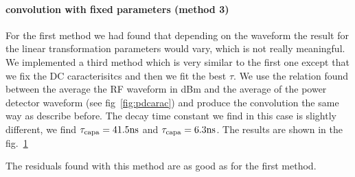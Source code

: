 \newpage
\paragraph{convolution with fixed parameters (method 3)}
For the first  method we had found that depending  on the waveform the
result for  the linear transformation parameters would  vary, which is
not really  meaningful.  We implemented  a third method which  is very
similar to the first one except  that we fix the DC caracterisitcs and
then we  fit the best $\tau$.   We use the relation  found between the
average the RF  waveform in dBm and the average  of the power detector
waveform (see  fig~\ref{fig:pdcarac}) and produce  the convolution the
same way as describe before.  The  decay time constant we find in this
case is  slightly different, we find  $\rm \tau_{capa} =  41.5 ns$ and
$\rm  \tau_{capa}   =  6.3  ns$.    The  results  are  shown   in  the
fig.~\ref{fig:m3ex}
\begin{figure}[!ht]
  \centering
  \hspace*{-3ex}
  \caption{}
  \label{fig:m3ex}
\end{figure}
The residuals  found with  this method  are as good  as for  the first
method.

\clearpage
